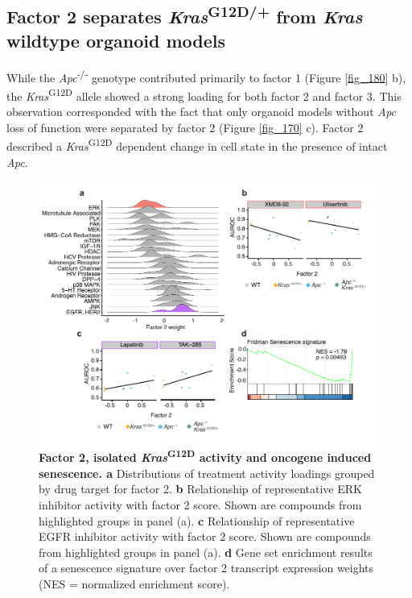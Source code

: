 \begin{flushleft}
\newpage
\clearpage
\subsection{Factor 2 separates \textit{Kras}\textsuperscript{G12D/+} from \textit{Kras} wildtype organoid models}
While the \textit{Apc}\textsuperscript{-/-}  genotype contributed primarily to factor 1 (Figure \ref{fig_180} b), the \textit{Kras}\textsuperscript{G12D} allele showed a strong loading for both factor 2 and factor 3. This observation corresponded with the fact that only organoid models without \textit{Apc} loss of function were separated by factor 2 (Figure \ref{fig_170} c). Factor 2 described a \textit{Kras}\textsuperscript{G12D} dependent change in cell state in the presence of intact \textit{Apc}.


\begin{figure}[h!]
\centering
\includegraphics[scale=0.75,
                keepaspectratio]{figures/adenomaprofiling/pdf/fig_3_1_2.pdf}
\caption[Factor 2, isolated \textit{Kras}\textsuperscript{G12D} activity and oncogene induced senescence]{\textbf{Factor 2, isolated \textit{Kras}\textsuperscript{G12D} activity and oncogene induced senescence. a} Distributions of treatment activity loadings grouped by drug target for factor 2. \textbf{b} Relationship of representative ERK inhibitor activity with factor 2 score. Shown are compounds from highlighted groups in panel (a). \textbf{c} Relationship of representative EGFR inhibitor activity with factor 2 score. Shown are compounds from highlighted groups in panel (a). \textbf{d} Gene set enrichment results of a senescence signature \parencite{fridmanCriticalPathwaysCellular2008} over factor 2 transcript expression weights (NES = normalized enrichment score).}
\label{fig_200}
\end{figure}


\end{flushleft}
